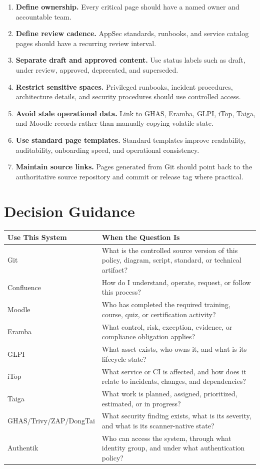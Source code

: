 \documentclass[10pt,letterpaper]{article}
\begin{document}
\begin{enumerate}
  \item \textbf{Define ownership.} Every critical page should have a named owner and accountable team.
  \item \textbf{Define review cadence.} AppSec standards, runbooks, and service catalog pages should have a recurring review interval.
  \item \textbf{Separate draft and approved content.} Use status labels such as draft, under review, approved, deprecated, and superseded.
  \item \textbf{Restrict sensitive spaces.} Privileged runbooks, incident procedures, architecture details, and security procedures should use controlled access.
  \item \textbf{Avoid stale operational data.} Link to GHAS, Eramba, GLPI, iTop, Taiga, and Moodle records rather than manually copying volatile state.
  \item \textbf{Use standard page templates.} Standard templates improve readability, auditability, onboarding speed, and operational consistency.
  \item \textbf{Maintain source links.} Pages generated from Git should point back to the authoritative source repository and commit or release tag where practical.
\end{enumerate}

\section{Decision Guidance}

\begin{tabularx}{\textwidth}{L{1.75in} Y}
\toprule
\textbf{Use This System} & \textbf{When the Question Is} \\
\midrule
Git & What is the controlled source version of this policy, diagram, script, standard, or technical artifact? \\
Confluence & How do I understand, operate, request, or follow this process? \\
Moodle & Who has completed the required training, course, quiz, or certification activity? \\
Eramba & What control, risk, exception, evidence, or compliance obligation applies? \\
GLPI & What asset exists, who owns it, and what is its lifecycle state? \\
iTop & What service or CI is affected, and how does it relate to incidents, changes, and dependencies? \\
Taiga & What work is planned, assigned, prioritized, estimated, or in progress? \\
GHAS/Trivy/ZAP/DongTai & What security finding exists, what is its severity, and what is its scanner-native state? \\
Authentik & Who can access the system, through what identity group, and under what authentication policy? \\
\bottomrule
\end{tabularx}
\end{document}
